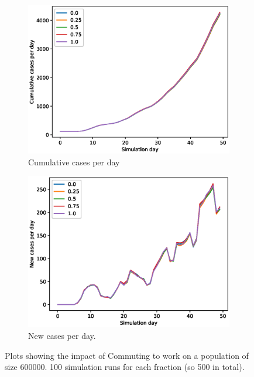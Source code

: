 \documentclass[runningheads]{llncs}
\begin{document}
\begin{figure}[h!]
	\centering
	\begin{subfigure}[b]{0.7\linewidth}
		\includegraphics[width=\textwidth]{work_cum_2.eps}
		\caption{Cumulative cases per day} 
	\end{subfigure}
	\begin{subfigure}[b]{0.7\linewidth}
		\includegraphics[width=\textwidth]{work_cases_per_day_2.eps}
		\caption{New cases per day.} 
	\end{subfigure}
	\caption{Plots showing the impact of Commuting to work on a population of size 600000. 100 simulation runs for each fraction (so 500 in total).}
	\label{fig:WorkCommuting2}
\end{figure}
\end{document}
